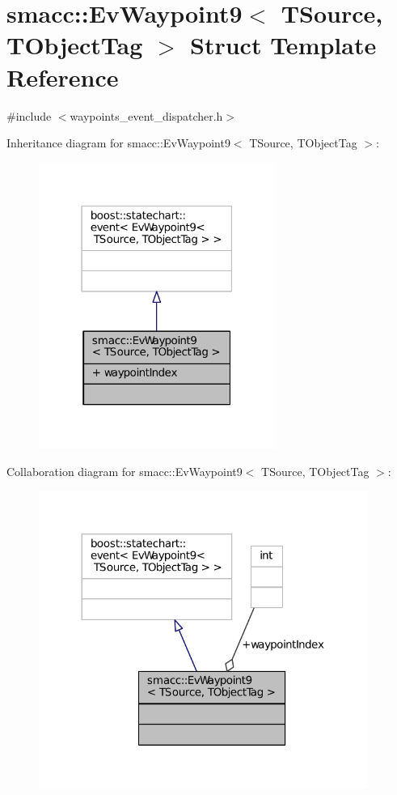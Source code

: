\hypertarget{structsmacc_1_1EvWaypoint9}{}\section{smacc\+:\+:Ev\+Waypoint9$<$ T\+Source, T\+Object\+Tag $>$ Struct Template Reference}
\label{structsmacc_1_1EvWaypoint9}


{\ttfamily \#include $<$waypoints\+\_\+event\+\_\+dispatcher.\+h$>$}



Inheritance diagram for smacc\+:\+:Ev\+Waypoint9$<$ T\+Source, T\+Object\+Tag $>$\+:
\nopagebreak
\begin{figure}[H]
\begin{center}
\leavevmode
\includegraphics[width=219pt]{structsmacc_1_1EvWaypoint9__inherit__graph}
\end{center}
\end{figure}


Collaboration diagram for smacc\+:\+:Ev\+Waypoint9$<$ T\+Source, T\+Object\+Tag $>$\+:
\nopagebreak
\begin{figure}[H]
\begin{center}
\leavevmode
\includegraphics[width=305pt]{structsmacc_1_1EvWaypoint9__coll__graph}
\end{center}
\end{figure}
